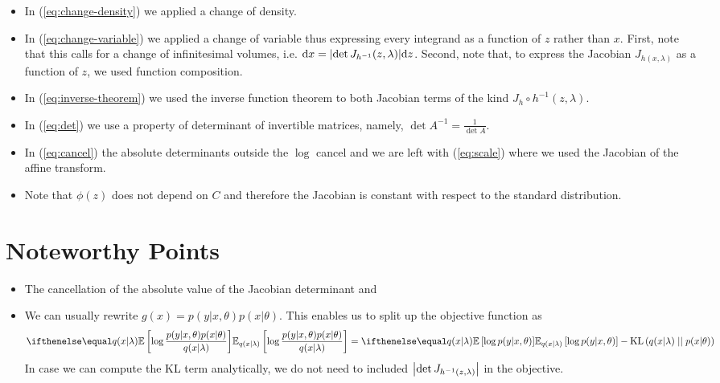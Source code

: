 \documentclass[a4paper,11pt]{article}
\begin{document}
\begin{itemize}
	\item In (\ref{eq:change-density}) we applied a change of density. 
	\item In (\ref{eq:change-variable}) we applied a change of variable thus expressing every integrand as a function of $z$ rather than $x$. First, note that this calls for a change of infinitesimal volumes, i.e. $\dd x = \abs{\det J_{h^{-1}}(z, \lambda)} \dd z$. Second, note that, to express the Jacobian $J_{h(x, \lambda)}$ as a function of $z$, we used function composition.
	\item In (\ref{eq:inverse-theorem}) we used the inverse function theorem to both Jacobian terms of the kind $J_{h} \circ h^{-1}(z, \lambda)$.
	\item In (\ref{eq:det}) we use a property of determinant of invertible matrices, namely, $\det A^{-1} = \frac{1}{\det A}$.	
	\item In (\ref{eq:cancel}) the absolute determinants outside the $\log$ cancel and we are left with (\ref{eq:scale}) where we used the Jacobian of the affine transform.
	\item Note that $\phi(z)$ does not depend on $C$ and therefore the Jacobian is constant with respect to the standard distribution. 
\end{itemize}

\section{Noteworthy Points}
\begin{itemize}
\item The cancellation of the absolute value of the Jacobian determinant and 
\item We can usually rewrite $ g(x) = p(y|x, \theta)p(x|\theta) $. This enables us to split up the objective function as
\begin{equation}
\E[q(x|\lambda)]{\log \dfrac{p(y|x, \theta)p(x|\theta)}{q(x|\lambda)}} = \E[q(x|\lambda)]{\log p(y|x, \theta)} - \KL{q(x|\lambda)}{p(x|\theta)}
\end{equation}
In case we can compute the KL term analytically, we do not need to included $\abs{\det J_{h^{-1}(z, \lambda)}}$ in the objective. 
\end{itemize}



\end{document}

